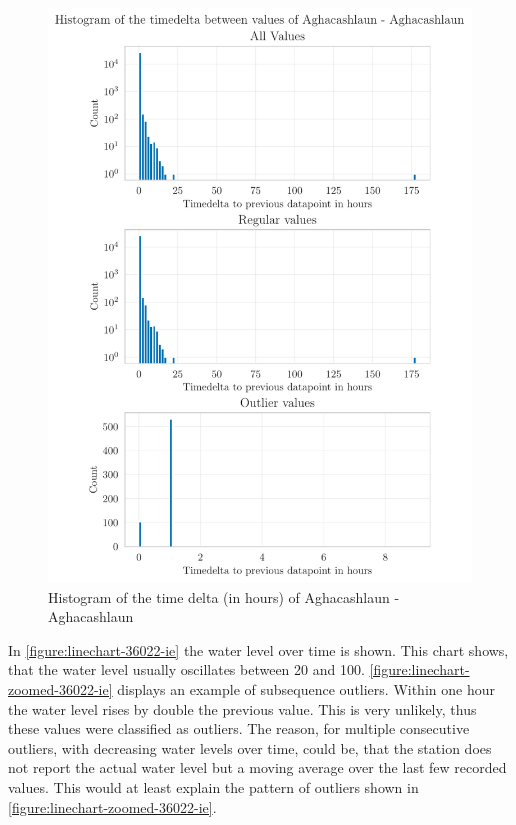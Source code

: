 \begin{figure}[htp]
    \centering
    \includegraphics{./plots/pdfs/36022-ie/time_delta_histogram_36022-ie.pdf}
    \caption{Histogram of the time delta (in hours) of Aghacashlaun - Aghacashlaun}
    \label{figure:time-delta-histogram-36022-ie}
\end{figure}
\newline
In \autoref{figure:linechart-36022-ie} the water level over time is shown. This chart shows, that the water level usually oscillates between 20 and 100. \autoref{figure:linechart-zoomed-36022-ie} displays an example of subsequence outliers. Within one hour the water level rises by double the previous value. This is very unlikely, thus these values were classified as outliers. The reason, for  multiple consecutive outliers, with decreasing water levels over time, could be, that the station does not report the actual water level but a moving average over the last few recorded values. This would at least explain the pattern of outliers shown in \autoref{figure:linechart-zoomed-36022-ie}.
